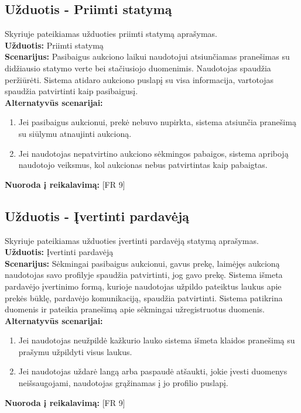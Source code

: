 \documentclass{VUMIFPSkursinis}
\begin{document}
	\subsection{Užduotis - Priimti statymą}
	Skyriuje pateikiamas užduoties priimti statymą aprašymas.\\
	\textbf{Užduotis:}  Priimti statymą \\
	\textbf{Scenarijus:}  Pasibaigus aukciono laikui naudotojui atsiunčiamas pranešimas su didžiausio statymo verte bei stačiusiojo duomenimis. Naudotojas spaudžia peržiūrėti. Sistema atidaro aukciono puslapį su visa informacija, vartotojas spaudžia patvirtinti kaip pasibaigusį.  \\
	\textbf{Alternatyvūs scenarijai:}
	\begin{enumerate}
		\item Jei pasibaigus aukcionui, prekė nebuvo nupirkta, sistema atsiunčia pranešimą su siūlymu atnaujinti aukcioną.
		\item Jei naudotojas nepatvirtino aukciono sėkmingos pabaigos, sistema apriboją naudotojo veiksmus, kol aukcionas nebus patvirtintas kaip pabaigtas.
	\end{enumerate}
	\textbf{Nuoroda į reikalavimą: } [FR 9]

	\subsection{Užduotis - Įvertinti pardavėją}
	Skyriuje pateikiamas užduoties įvertinti pardavėją statymą aprašymas.\\
	\textbf{Užduotis:}  Įvertinti pardavėją \\
	\textbf{Scenarijus:}  Sėkmingai pasibaigus aukcionui, gavus prekę, laimėjęs aukcioną naudotojas savo profilyje spaudžia patvirtinti, jog gavo prekę. Sistema išmeta pardavėjo įvertinimo formą, kurioje naudotojas užpildo pateiktus laukus apie prekės būklę, pardavėjo komunikaciją, spaudžia patvirtinti. Sistema patikrina duomenis ir pateikia pranešimą apie sėkmingai užregistruotus duomenis. \\
	\textbf{Alternatyvūs scenarijai:}
	\begin{enumerate}
		\item Jei naudotojas neužpildė kažkurio lauko sistema išmeta klaidos pranešimą su prašymu užpildyti visus laukus.
		\item Jei naudotojas uždarė langą arba paspaudė atšaukti, jokie įvesti duomenys neišsaugojami, naudotojas grąžinamas į jo profilio puslapį.
	\end{enumerate}
	\textbf{Nuoroda į reikalavimą: } [FR 9]
\end{document}
